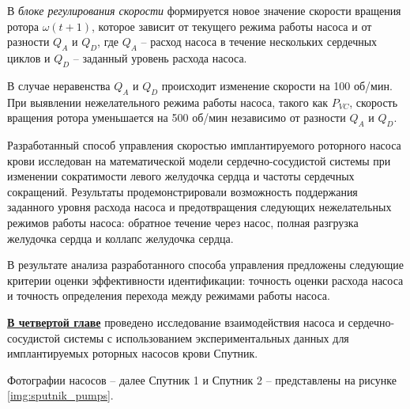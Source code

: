 В \textit{блоке регулирования скорости} формируется новое значение скорости вращения ротора $\omega(t+1)$, которое зависит от текущего режима работы насоса и от разности $Q_A$ и $Q_D$, где $Q_A$ -- расход насоса в течение нескольких сердечных циклов и $Q_D$ -- заданный уровень расхода насоса. 

В случае неравенства $Q_A$ и $Q_D$ происходит изменение скорости на 100 об/мин. При выявлении нежелательного режима работы насоса, такого как $P_{VC}$, скорость вращения ротора уменьшается на 500 об/мин независимо от разности $Q_A$ и $Q_D$. %

Разработанный способ управления скоростью имплантируемого роторного насоса крови исследован на математической модели сердечно-сосудистой системы при изменении сократимости левого желудочка сердца и частоты сердечных сокращений. Результаты продемонстрировали возможность поддержания заданного уровня расхода насоса и предотвращения следующих нежелательных режимов работы насоса: обратное течение через насос, полная разгрузка желудочка сердца и коллапс желудочка сердца. 

В результате анализа разработанного способа управления предложены следующие критерии оценки эффективности идентификации: точность оценки расхода насоса и точность определения перехода между режимами работы насоса.


\underline{\textbf{В четвертой главе}} проведено исследование взаимодействия насоса и сердечно-сосудистой системы с использованием экспериментальных данных для имплантируемых роторных насосов крови Спутник.

Фотографии насосов -- далее Спутник 1 и Спутник 2 -- представлены на рисунке \ref{img:sputnik_pumps}. %


